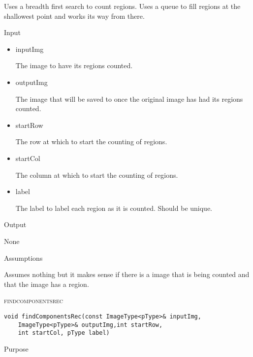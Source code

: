 \documentclass[pdftex, 11pt]{article}
\begin{document}
\begin{description}
\begin{description}
				Uses a breadth first search to count regions. Uses
				a queue to fill regions at the shallowest point
				and works its way from there.

			\item{Input}

				\begin{itemize}

					\item{inputImg}

						The image to have its regions
						counted.

					\item{outputImg}

						The image that will be saved to
						once the original image has had
						its regions counted.

					\item{startRow}

						The row at which to start the
						counting of regions.

					\item{startCol}

						The column at which to start the
						counting of regions.

					\item{label}

						The label to label each region
						as it is counted. Should be
						unique.
				

				\end{itemize}

			\item{Output}

				None

			\item{Assumptions}

				Assumes nothing but it makes sense if there is a
				image that is being counted and that the image
				has a region.


		\end{description}
		
	\item{\textsc{findcomponentsrec}}

		\begin{lstlisting}
void findComponentsRec(const ImageType<pType>& inputImg,
	ImageType<pType>& outputImg,int startRow, 
	int startCol, pType label)
		\end{lstlisting}

		\begin{description}
			\item{Purpose}


\end{description}
\end{description}
\end{document}
